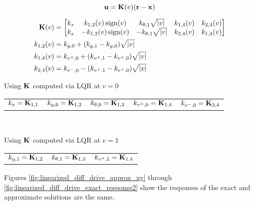 \begin{theorem}
  \begin{equation*}
    \mathbf{u} = \mathbf{K}(v) (\mathbf{r} - \mathbf{x})
  \end{equation*}

  \begin{align}
    \mathbf{K}(v) &= \begin{bmatrix}
      k_x & k_{1, 2}(v) \operatorname{sign}(v) & k_{\theta, 1} \sqrt{|v|} & k_{1, 4}(v) &
        k_{2, 4}(v) \\
      k_x & -k_{1, 2}(v) \operatorname{sign}(v) & -k_{\theta, 1} \sqrt{|v|} & k_{2, 4}(v) &
        k_{1, 4}(v)
    \end{bmatrix} \\
    k_{1, 2}(v) &= k_{y, 0} + (k_{y, 1} - k_{y, 0}) \sqrt{|v|} \\
    k_{1, 4}(v) &= k_{v^+, 0} + (k_{v^+, 1} - k_{v^+, 0}) \sqrt{|v|} \\
    k_{2, 4}(v) &= k_{v^-, 0} - (k_{v^+, 1} - k_{v^+, 0}) \sqrt{|v|}
  \end{align}

  Using $\mathbf{K}$ computed via LQR at $v = 0$ \\
  \begin{figurekey}
    \begin{tabulary}{\linewidth}{LLLLL}
      $k_x = \mathbf{K}_{1, 1}$ &
        $k_{y, 0} = \mathbf{K}_{1, 2}$ &
        $k_{\theta, 0} = \mathbf{K}_{1, 3}$ &
        $k_{v^+, 0} = \mathbf{K}_{1, 4}$ &
        $k_{v^-, 0} = \mathbf{K}_{2, 4}$ \\
    \end{tabulary} \\
  \end{figurekey}

  Using $\mathbf{K}$ computed via LQR at $v = 1$ \\
  \begin{figurekey}
    \begin{tabulary}{\linewidth}{LLL}
        $k_{y, 1} = \mathbf{K}_{1, 2}$ &
        $k_{\theta, 1} = \mathbf{K}_{1, 3}$ &
        $k_{v^+, 1} = \mathbf{K}_{1, 4}$
    \end{tabulary}
  \end{figurekey}
\end{theorem}

Figures \ref{fig:linearized_diff_drive_approx_xy} through
\ref{fig:linearized_diff_drive_exact_response2} show the responses of the exact
and approximate solutions are the same.

